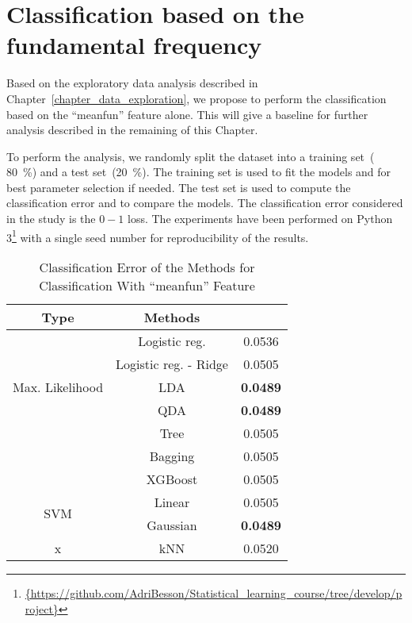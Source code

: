\section{Classification based on the fundamental frequency}
\label{sec_intuitive_approach}
Based on the exploratory data analysis described in Chapter~\ref{chapter_data_exploration}, we propose to perform the classification based on the ``meanfun'' feature alone. 
This will give a baseline for further analysis described in the remaining of this Chapter.

To perform the analysis, we randomly split the dataset into a training set~( \SI{80}{\percent}) and a test set~(\SI{20}{\percent}). 
The training set is used to fit the models and for best parameter selection if needed. The test set is used to compute the classification error and to compare the models. The classification error considered in the study is the $0-1$ loss. 
The experiments have been performed on Python \num{3}\footnote{\url{{https://github.com/AdriBesson/Statistical_learning_course/tree/develop/project}}} with a single seed number for reproducibility of the results.
\begin{table}[htb]
	\caption{Classification Error of the Methods for Classification With ``meanfun'' Feature}
	\begin{center}
		\begin{tabular}{@{} c c c @{}}\toprule
			Type & Methods & \\
			\midrule
			\multirow{5}{*}{Max. Likelihood} & Logistic reg. & \num{0.0536} \\
			& Logistic reg. - Ridge & \num{0.0505}  \\
			& LDA & \textbf{\num{0.0489}} \\
			& QDA & \textbf{\num{0.0489}} \\
			\cmidrule{1-3}
			\multirow{3}{*}{Trees} & Tree & \num{0.0505} \\
			& Bagging & \num{0.0505} \\
			& XGBoost & \num{0.0505}\\
			\cmidrule{1-3}
			\multirow{2}{*}{SVM} & Linear & \num{0.0505} \\
			& Gaussian & \textbf{\num{0.0489}} \\
			\cmidrule{1-3}
			x & kNN & \num{0.0520}\\
			\bottomrule
		\end{tabular}
	\end{center}
	\label{tab_res_meanfun}
\end{table}

